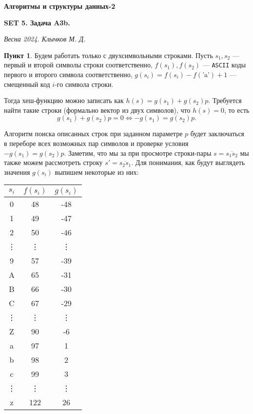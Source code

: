 \documentclass[11pt,a4paper]{scrarticle}
\author{Клычков Максим Дмитриевич}
\theoremstyle{definition}
\newtheorem{subtask}{Пункт}
\begin{document}
\centerline{\textbf{\huge Алгоритмы и структуры данных-2}}
\centerline{\textbf{SET 5. Задача A3b.}}
\begin{flushright}
    \emph{Весна 2024. Клычков М. Д.}
\end{flushright}

\setlength{\tabcolsep}{4pt}
\renewcommand{\arraystretch}{1.2}

\begin{subtask}
    Будем работать только с двухсимвольными строками. Пусть $s_1, s_2$ — первый и второй символы строки соответственно, $f(s_1), f(s_2)$ — \texttt{ASCII} коды первого и второго символа соответственно, $g(s_i) = f(s_i) - f(\text{'a'}) + 1$ — смещенный код $i$-го символа строки.

    Тогда хеш-функцию можно записать как $h(s) = g(s_1) + g(s_2) p$. Требуется найти такие строки (формально вектор из двух символов), что $h(s) = 0$, то есть
    $$g(s_1) + g(s_2) p = 0 \Longleftrightarrow -g(s_1) = g(s_2) p.$$

    Алгоритм поиска описанных строк при заданном параметре $p$ будет заключаться в переборе всех возможных пар символов и проверке условия $-g(s_1) = g(s_2) p$. Заметим, что мы за при просмотре строки-пары $s = \overline{s_1 s_2}$ мы также можем рассмотреть строку $s' = \overline{s_2 s_1}$. Для понимания, как будут выглядеть значения $g(s_i)$ выпишем некоторые из них:

    \begin{table}[h!]
        \centering
        \begin{tabular}{|c|c|c|}
            \hline
            $s_i$  & $f(s_i)$ & $g(s_i)$ \\
            \hline
            0      & 48       & -48      \\
            1      & 49       & -47      \\
            2      & 50       & -46      \\
            \vdots & \vdots   & \vdots   \\
            9      & 57       & -39      \\
            A      & 65       & -31      \\
            B      & 66       & -30      \\
            C      & 67       & -29      \\
            \vdots & \vdots   & \vdots   \\
            Z      & 90       & -6       \\
            a      & 97       & 1        \\
            b      & 98       & 2        \\
            c      & 99       & 3        \\
            \vdots & \vdots   & \vdots   \\
            z      & 122      & 26       \\
            \hline
        \end{tabular}
    \end{table}


\end{subtask}
\end{document}
